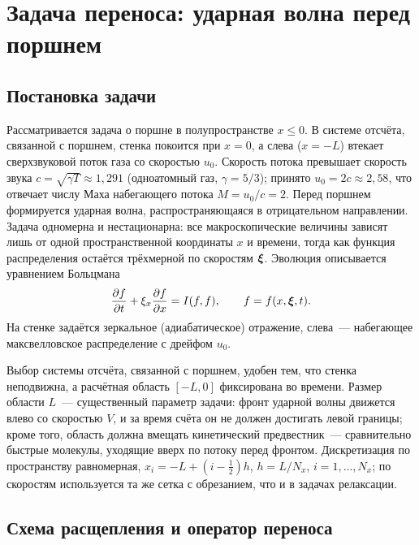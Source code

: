 
\chapter{Задача переноса: ударная волна перед поршнем}

\section{Постановка задачи}

Рассматривается задача о поршне в полупространстве $x\le 0$.
В системе отсчёта, связанной с поршнем, стенка покоится при $x=0$, а слева ($x=-L$) втекает сверхзвуковой поток газа со
скоростью $u_0$.
Скорость потока превышает скорость звука $c=\sqrt{\gamma T}\approx 1{,}291$ (одноатомный газ, $\gamma=5/3$); принято
$u_0=2c\approx 2{,}58$, что отвечает числу Маха набегающего потока $M=u_0/c=2$.
Перед поршнем формируется ударная волна, распространяющаяся в отрицательном направлении.
Задача одномерна и нестационарна: все макроскопические величины зависят лишь от одной пространственной координаты $x$ и
времени, тогда как функция распределения остаётся трёхмерной по скоростям $\boldsymbol{\xi}$.
Эволюция описывается уравнением Больцмана
\begin{equation}
    \frac{\partial f}{\partial t}+\xi_x\frac{\partial f}{\partial x}=I(f,f),\qquad f=f(x,\boldsymbol{\xi},t).
\end{equation}
На стенке задаётся зеркальное (адиабатическое) отражение, слева~--- набегающее максвелловское распределение с дрейфом
$u_0$.

Выбор системы отсчёта, связанной с поршнем, удобен тем, что стенка неподвижна, а расчётная область $[-L,0]$ фиксирована
во времени.
Размер области $L$~--- существенный параметр задачи: фронт ударной волны движется влево со скоростью $V$, и за время
счёта он не должен достигать левой границы; кроме того, область должна вмещать кинетический предвестник~--- сравнительно
быстрые молекулы, уходящие вверх по потоку перед фронтом.
Дискретизация по пространству равномерная, $x_i=-L+(i-\tfrac12)h$, $h=L/N_x$, $i=1,\dots,N_x$; по скоростям используется
та же сетка с обрезанием, что и в задачах релаксации.

\section{Схема расщепления и оператор переноса}

